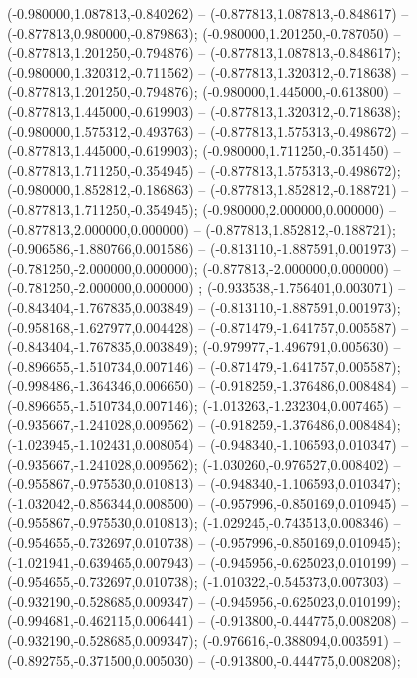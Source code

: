 (-0.980000,1.087813,-0.840262) -- (-0.877813,1.087813,-0.848617) -- (-0.877813,0.980000,-0.879863);
 (-0.980000,1.201250,-0.787050) -- (-0.877813,1.201250,-0.794876) -- (-0.877813,1.087813,-0.848617);
 (-0.980000,1.320312,-0.711562) -- (-0.877813,1.320312,-0.718638) -- (-0.877813,1.201250,-0.794876);
 (-0.980000,1.445000,-0.613800) -- (-0.877813,1.445000,-0.619903) -- (-0.877813,1.320312,-0.718638);
 (-0.980000,1.575312,-0.493763) -- (-0.877813,1.575313,-0.498672) -- (-0.877813,1.445000,-0.619903);
 (-0.980000,1.711250,-0.351450) -- (-0.877813,1.711250,-0.354945) -- (-0.877813,1.575313,-0.498672);
 (-0.980000,1.852812,-0.186863) -- (-0.877813,1.852812,-0.188721) -- (-0.877813,1.711250,-0.354945);
 (-0.980000,2.000000,0.000000) -- (-0.877813,2.000000,0.000000) -- (-0.877813,1.852812,-0.188721);
 (-0.906586,-1.880766,0.001586) -- (-0.813110,-1.887591,0.001973) -- (-0.781250,-2.000000,0.000000);
 (-0.877813,-2.000000,0.000000) -- (-0.781250,-2.000000,0.000000) ;
 (-0.933538,-1.756401,0.003071) -- (-0.843404,-1.767835,0.003849) -- (-0.813110,-1.887591,0.001973);
 (-0.958168,-1.627977,0.004428) -- (-0.871479,-1.641757,0.005587) -- (-0.843404,-1.767835,0.003849);
 (-0.979977,-1.496791,0.005630) -- (-0.896655,-1.510734,0.007146) -- (-0.871479,-1.641757,0.005587);
 (-0.998486,-1.364346,0.006650) -- (-0.918259,-1.376486,0.008484) -- (-0.896655,-1.510734,0.007146);
 (-1.013263,-1.232304,0.007465) -- (-0.935667,-1.241028,0.009562) -- (-0.918259,-1.376486,0.008484);
 (-1.023945,-1.102431,0.008054) -- (-0.948340,-1.106593,0.010347) -- (-0.935667,-1.241028,0.009562);
 (-1.030260,-0.976527,0.008402) -- (-0.955867,-0.975530,0.010813) -- (-0.948340,-1.106593,0.010347);
 (-1.032042,-0.856344,0.008500) -- (-0.957996,-0.850169,0.010945) -- (-0.955867,-0.975530,0.010813);
 (-1.029245,-0.743513,0.008346) -- (-0.954655,-0.732697,0.010738) -- (-0.957996,-0.850169,0.010945);
 (-1.021941,-0.639465,0.007943) -- (-0.945956,-0.625023,0.010199) -- (-0.954655,-0.732697,0.010738);
 (-1.010322,-0.545373,0.007303) -- (-0.932190,-0.528685,0.009347) -- (-0.945956,-0.625023,0.010199);
 (-0.994681,-0.462115,0.006441) -- (-0.913800,-0.444775,0.008208) -- (-0.932190,-0.528685,0.009347);
 (-0.976616,-0.388094,0.003591) -- (-0.892755,-0.371500,0.005030) -- (-0.913800,-0.444775,0.008208);
